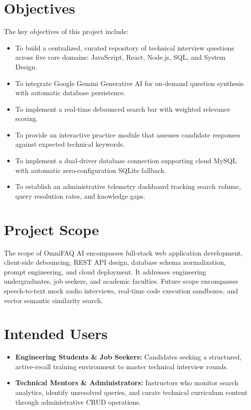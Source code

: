 \section{Objectives}
The key objectives of this project include:
\begin{itemize}
    \item To build a centralized, curated repository of technical interview questions across five core domains: JavaScript, React, Node.js, SQL, and System Design.
    \item To integrate Google Gemini Generative AI for on-demand question synthesis with automatic database persistence.
    \item To implement a real-time debounced search bar with weighted relevance scoring.
    \item To provide an interactive practice module that assesses candidate responses against expected technical keywords.
    \item To implement a dual-driver database connection supporting cloud MySQL with automatic zero-configuration SQLite fallback.
    \item To establish an administrative telemetry dashboard tracking search volume, query resolution rates, and knowledge gaps.
\end{itemize}

\section{Project Scope}
The scope of OmniFAQ AI encompasses full-stack web application development, client-side debouncing, REST API design, database schema normalization, prompt engineering, and cloud deployment. It addresses engineering undergraduates, job seekers, and academic faculties. Future scope encompasses speech-to-text mock audio interviews, real-time code execution sandboxes, and vector semantic similarity search.

\section{Intended Users}
\begin{itemize}
    \item \textbf{Engineering Students \& Job Seekers:} Candidates seeking a structured, active-recall training environment to master technical interview rounds.
    \item \textbf{Technical Mentors \& Administrators:} Instructors who monitor search analytics, identify unresolved queries, and curate technical curriculum content through administrative CRUD operations.
\end{itemize}


